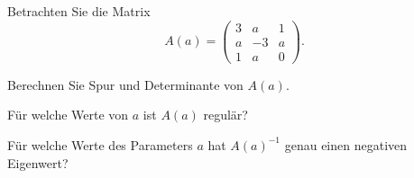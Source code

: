 Betrachten Sie die Matrix
\[
A(a)
=
\begin{pmatrix}
 3& a& 1\\
 a&-3& a\\
 1& a& 0
\end{pmatrix}.
\]
\begin{teilaufgaben}
\item
Berechnen Sie Spur und Determinante von $A(a)$.
\item 
Für welche Werte von $a$ ist $A(a)$ regulär?
\item
Für welche Werte des Parameters $a$ hat $A(a)^{-1}$
genau einen negativen Eigenwert?
\end{teilaufgaben}


